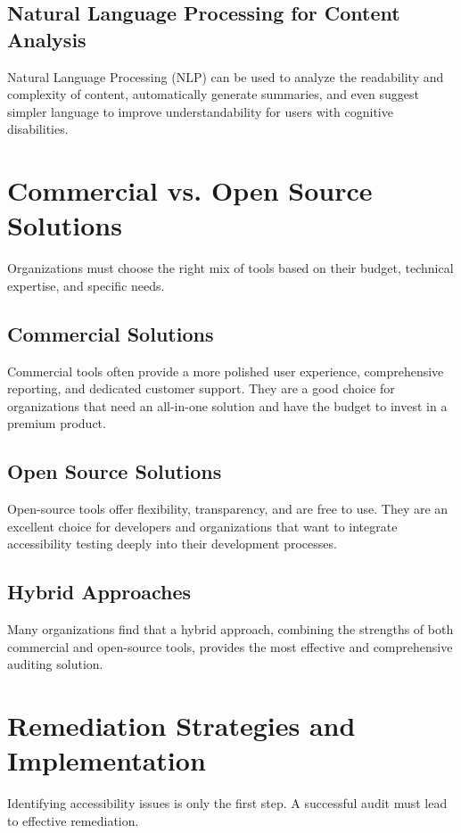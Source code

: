 \subsection{Natural Language Processing for Content Analysis}
\label{subsec:nlp-analysis}
Natural Language Processing (NLP) can be used to analyze the readability and complexity of content, automatically generate summaries, and even suggest simpler language to improve understandability for users with cognitive disabilities.
\supercite{Lundgard2022Accessible}

\section{Commercial vs. Open Source Solutions}
\label{sec:commercial-vs-open-source}
Organizations must choose the right mix of tools based on their budget, technical expertise, and specific needs.

\subsection{Commercial Solutions}
\label{subsec:commercial-solutions}
Commercial tools often provide a more polished user experience, comprehensive reporting, and dedicated customer support. They are a good choice for organizations that need an all-in-one solution and have the budget to invest in a premium product.

\subsection{Open Source Solutions}
\label{subsec:open-source-solutions}
Open-source tools offer flexibility, transparency, and are free to use. They are an excellent choice for developers and organizations that want to integrate accessibility testing deeply into their development processes.

\subsection{Hybrid Approaches}
\label{subsec:hybrid-approaches}
Many organizations find that a hybrid approach, combining the strengths of both commercial and open-source tools, provides the most effective and comprehensive auditing solution.

\section{Remediation Strategies and Implementation}
\label{sec:remediation-strategies}
Identifying accessibility issues is only the first step. A successful audit must lead to effective remediation.

